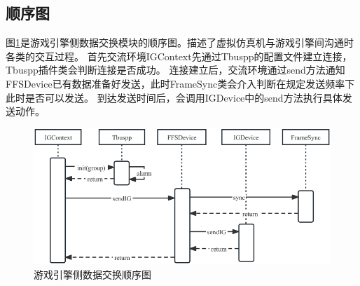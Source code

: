 \subsection{顺序图}
图\ref{seq3}是游戏引擎侧数据交换模块的顺序图。描述了虚拟仿真机与游戏引擎间沟通时各类的交互过程。
首先交流环境IGContext先通过Tbuspp的配置文件建立连接，Tbuspp插件类会判断连接是否成功。
连接建立后，交流环境通过send方法通知FFSDevice已有数据准备好发送，此时FrameSync类会介入判断在规定发送频率下此时是否可以发送。
到达发送时间后，会调用IGDevice中的send方法执行具体发送动作。
\begin{figure}[h!]
    \begin{center}
        \includegraphics[width=\textwidth]{pictures/sequence3.pdf}
        \caption{游戏引擎侧数据交换顺序图}
        \label{seq3}
    \end{center}
\end{figure}
